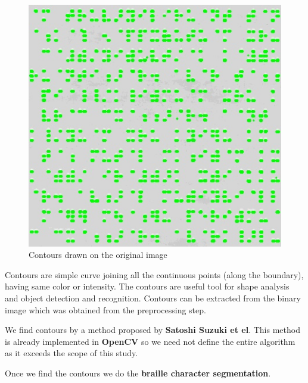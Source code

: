 \documentclass{article}
\begin{document}
\begin{figure}[!htb]
\caption{Contours drawn on the original image}
\centering
\includegraphics[scale=0.4]{contours}
\end{figure}


Contours are simple curve joining all the continuous points (along the boundary), having same color or intensity. The contours are useful tool for shape analysis and object detection and recognition. Contours can be extracted from the binary image which was obtained from the preprocessing step.

We find contours by a method proposed by \textbf{Satoshi Suzuki et el}. This method is already implemented in \textbf{OpenCV} so we need not define the entire algorithm as it exceeds the scope of this study.

Once we find the contours we do the \textbf{braille character segmentation}.
\end{document}
